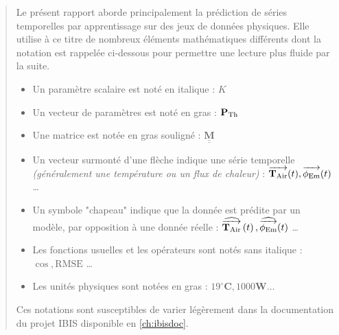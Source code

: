 \newpage\renewcommand{\abstractname}{Notations}
\begin{abstract}


    \begin{bluebox}
        Le présent rapport aborde principalement la prédiction de séries temporelles par apprentissage sur des jeux de données physiques.
        Elle utilise à ce titre de nombreux éléments mathématiques différents dont la notation est rappelée ci-dessous pour permettre une lecture plus fluide par la suite.
    \end{bluebox}

    \begin{itemize}
        \item Un paramètre scalaire est noté en italique : $K$
        \item Un vecteur de paramètres est noté en gras : $\PTh$
        \item Une matrice est notée en gras souligné : $\underline{\underline{\mathbf M}}$
        \item Un vecteur surmonté d'une flèche indique une série temporelle \textit{(généralement une température ou un flux de chaleur)} : $\TAir{t}, \PhiEm{t}$ \ldots
        \item Un symbole "chapeau" indique que la donnée est prédite par un modèle, par opposition à une donnée réelle : $\ThatAir{t}, \PhihatEm{t}$ \ldots
        \item Les fonctions usuelles et les opérateurs sont notés sans italique : $\cos, \mathrm{RMSE}$ \ldots
        \item Les unités physiques sont notées en gras : $19^\circ \mathbf C, 1000\mathbf W \ldots$
    \end{itemize}

    Ces notations sont susceptibles de varier légèrement dans la documentation du projet IBIS disponible en \ref{ch:ibisdoc}.

\end{abstract}
